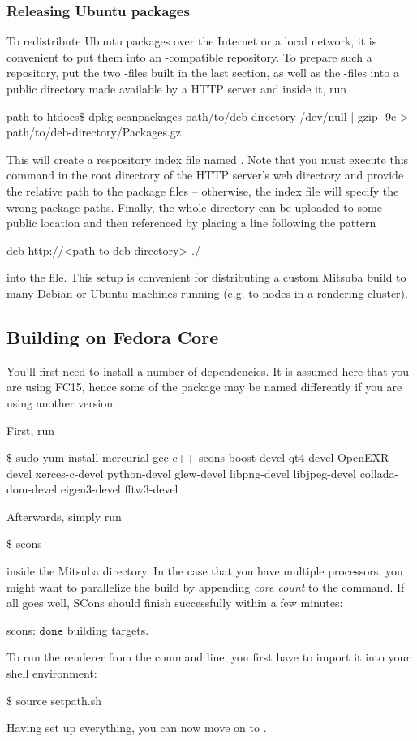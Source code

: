 \subsubsection{Releasing Ubuntu packages}
To redistribute Ubuntu packages over the Internet or a local network, it is convenient to
put them into an -compatible repository. To prepare such a
repository, put the two -files built in the last section,
as well as the  -files into a public directory
made available by a HTTP server and inside it, run
\begin{shell}
path-to-htdocs$\text{\$}$ dpkg-scanpackages path/to/deb-directory /dev/null | gzip -9c > path/to/deb-directory/Packages.gz
\end{shell}
This will create a respository index file named .
Note that you must execute this command in the root directory of the
HTTP server's web directory and provide the relative path to the
package files -- otherwise, the index file will specify the wrong package
paths. Finally, the whole directory can be uploaded to some public location
and then referenced by placing a line following the pattern
\begin{shell}
deb http://<path-to-deb-directory> ./
\end{shell}
into the  file. This setup is convenient for
distributing a custom Mitsuba build to many Debian or Ubuntu machines running (e.g. to nodes in a rendering cluster).
\subsection{Building on Fedora Core}
You'll first need to install a number of dependencies. It is assumed here
that you are using FC15, hence some of the package may be named differently if you are
using another version.

First, run
\begin{shell}
$\text{\$}$ sudo yum install mercurial gcc-c++ scons boost-devel qt4-devel OpenEXR-devel xerces-c-devel python-devel glew-devel libpng-devel libjpeg-devel collada-dom-devel eigen3-devel fftw3-devel
\end{shell}
Afterwards, simply run
\begin{shell}
$\text{\$}$ scons
\end{shell}
inside the Mitsuba directory. In the case that you have multiple processors, you might want to parallelize the build by appending \emph{core count} to the command.
If all goes well, SCons should finish successfully within a few minutes:
\begin{shell}
scons: $\texttt{done}$ building targets.
\end{shell}
To run the renderer from the command line, you first have to import it into your shell environment:
\begin{shell}
$\text{\$}$ source setpath.sh
\end{shell}
Having set up everything, you can now move on to .
